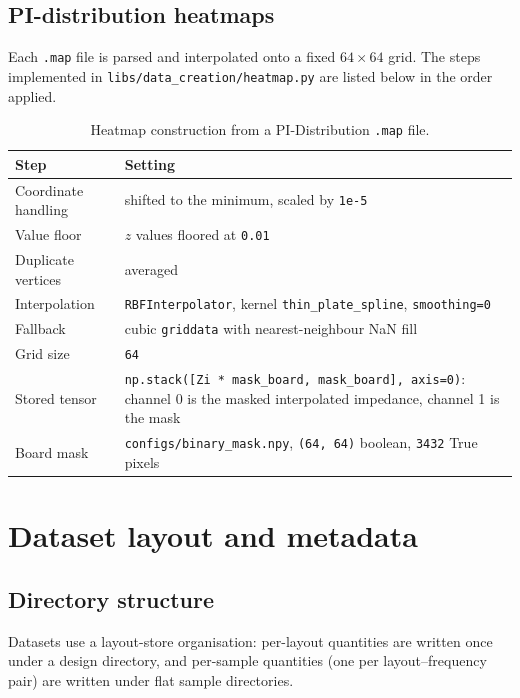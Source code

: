 \subsection{PI-distribution heatmaps}
\label{subsec:appA_heatmap}

Each \texttt{.map} file is parsed and interpolated onto a fixed $64\times64$ grid. The steps
implemented in \texttt{libs/data\_creation/heatmap.py} are listed below in the order applied.

\begin{table}[htbp]
\centering
\caption{Heatmap construction from a PI-Distribution \texttt{.map} file.}
\label{tab:appA_heatmap_steps}
\begin{tabular}{p{} p{}}
\hline
Step & Setting \\
\hline
Coordinate handling & shifted to the minimum, scaled by \texttt{1e-5} \\
Value floor & $z$ values floored at \texttt{0.01} \\
Duplicate vertices & averaged \\
Interpolation & \texttt{RBFInterpolator}, kernel \texttt{thin\_plate\_spline},
\texttt{smoothing=0} \\
Fallback & cubic \texttt{griddata} with nearest-neighbour NaN fill \\
Grid size & \texttt{64} \\
Stored tensor & \texttt{np.stack([Zi * mask\_\allowbreak{}board, mask\_\allowbreak{}board], axis=0)}: channel 0 is the masked
interpolated impedance, channel 1 is the mask \\
Board mask & \texttt{configs/binary\_mask.npy}, \texttt{(64, 64)} boolean, \texttt{3432} True
pixels \\
\hline
\end{tabular}
\end{table}

\section{Dataset layout and metadata}
\label{sec:appA_dataset_layout}

\subsection{Directory structure}
\label{subsec:appA_dir_structure}

Datasets use a layout-store organisation: per-layout quantities are written once under a design
directory, and per-sample quantities (one per layout--frequency pair) are written under flat
sample directories.

